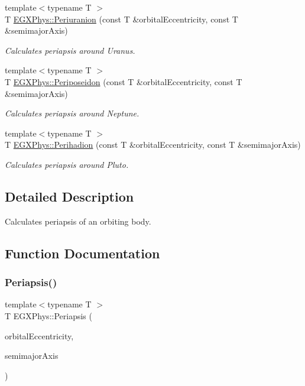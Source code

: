 \begin{DoxyCompactItemize}
{\footnotesize template$<$typename T $>$ }\\T \hyperlink{group___e_g_x_phys-_periapsis_gab8b8131a617dd2d2a4de1d48accd7442}{E\+G\+X\+Phys\+::\+Periuranion} (const T \&orbital\+Eccentricity, const T \&semimajor\+Axis)
\begin{DoxyCompactList}\small\item\em Calculates periapsis around Uranus. \end{DoxyCompactList}\item 
{\footnotesize template$<$typename T $>$ }\\T \hyperlink{group___e_g_x_phys-_periapsis_ga237e7af3794202c67e65f64f4c8abc2a}{E\+G\+X\+Phys\+::\+Periposeidon} (const T \&orbital\+Eccentricity, const T \&semimajor\+Axis)
\begin{DoxyCompactList}\small\item\em Calculates periapsis around Neptune. \end{DoxyCompactList}\item 
{\footnotesize template$<$typename T $>$ }\\T \hyperlink{group___e_g_x_phys-_periapsis_gafb16e46e55078b38604eef0d7c7c40c4}{E\+G\+X\+Phys\+::\+Perihadion} (const T \&orbital\+Eccentricity, const T \&semimajor\+Axis)
\begin{DoxyCompactList}\small\item\em Calculates periapsis around Pluto. \end{DoxyCompactList}\end{DoxyCompactItemize}


\subsection{Detailed Description}
Calculates periapsis of an orbiting body. 

\subsection{Function Documentation}
\mbox{\label{group___e_g_x_phys-_periapsis_ga4414ac75539371ec874a3d25cad6c9fe}} 
\subsubsection{\texorpdfstring{Periapsis()}{Periapsis()}}
{\footnotesize\ttfamily template$<$typename T $>$ \\
T E\+G\+X\+Phys\+::\+Periapsis (\begin{DoxyParamCaption}\item[{const T \&}]{orbital\+Eccentricity,  }\item[{const T \&}]{semimajor\+Axis }\end{DoxyParamCaption})}



